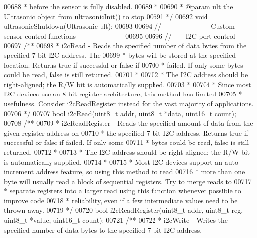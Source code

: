 \begin{DoxyCode}
00688 \textcolor{comment}{ * before the sensor is fully disabled.}
00689 \textcolor{comment}{ *}
00690 \textcolor{comment}{ * @param ult the Ultrasonic object from ultrasonicInit() to stop}
00691 \textcolor{comment}{ */}
00692 \textcolor{keywordtype}{void} ultrasonicShutdown(Ultrasonic ult);
00693 
00694 \textcolor{comment}{// -------------------- Custom sensor control functions --------------------}
00695 
00696 \textcolor{comment}{// ---- I2C port control ----}
00697 \textcolor{comment}{/**}
00698 \textcolor{comment}{ * i2cRead - Reads the specified number of data bytes from the specified 7-bit I2C address. The}
00699 \textcolor{comment}{ * bytes will be stored at the specified location. Returns true if successful or false if}
00700 \textcolor{comment}{ * failed. If only some bytes could be read, false is still returned.}
00701 \textcolor{comment}{ *}
00702 \textcolor{comment}{ * The I2C address should be right-aligned; the R/W bit is automatically supplied.}
00703 \textcolor{comment}{ *}
00704 \textcolor{comment}{ * Since most I2C devices use an 8-bit register architecture, this method has limited}
00705 \textcolor{comment}{ * usefulness. Consider i2cReadRegister instead for the vast majority of applications.}
00706 \textcolor{comment}{ */}
00707 \textcolor{keywordtype}{bool} i2cRead(uint8\_t addr, uint8\_t *data, uint16\_t count);
00708 \textcolor{comment}{/**}
00709 \textcolor{comment}{ * i2cReadRegister - Reads the specified amount of data from the given register address on}
00710 \textcolor{comment}{ * the specified 7-bit I2C address. Returns true if successful or false if failed. If only some}
00711 \textcolor{comment}{ * bytes could be read, false is still returned.}
00712 \textcolor{comment}{ *}
00713 \textcolor{comment}{ * The I2C address should be right-aligned; the R/W bit is automatically supplied.}
00714 \textcolor{comment}{ *}
00715 \textcolor{comment}{ * Most I2C devices support an auto-increment address feature, so using this method to read}
00716 \textcolor{comment}{ * more than one byte will usually read a block of sequential registers. Try to merge reads to}
00717 \textcolor{comment}{ * separate registers into a larger read using this function whenever possible to improve code}
00718 \textcolor{comment}{ * reliability, even if a few intermediate values need to be thrown away.}
00719 \textcolor{comment}{ */}
00720 \textcolor{keywordtype}{bool} i2cReadRegister(uint8\_t addr, uint8\_t reg, uint8\_t *value, uint16\_t count);
00721 \textcolor{comment}{/**}
00722 \textcolor{comment}{ * i2cWrite - Writes the specified number of data bytes to the specified 7-bit I2C address.}

\end{DoxyCode}
